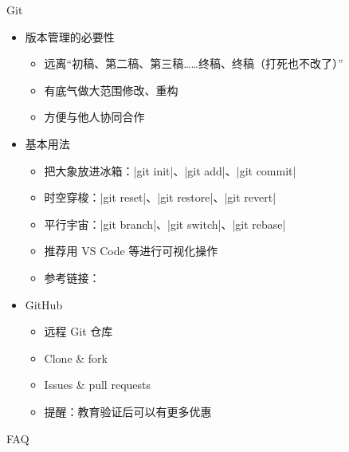 \begin{frame}{Git}
\begin{itemize}
  \item<+-> 版本管理的必要性
    \begin{itemize}
      \item 远离``初稿、第二稿、第三稿……终稿、终稿（打死也不改了）''
      \item 有底气做大范围修改、重构
      \item 方便与他人协同合作
    \end{itemize}

  \item<+-> 基本用法
    \begin{itemize}
      \item 把大象放进冰箱：|git init|、|git add|、|git commit|
      \item 时空穿梭：|git reset|、|git restore|、|git revert|
      \item 平行宇宙：|git branch|、|git switch|、|git rebase|
      \item 推荐用 VS Code 等进行可视化操作
      \item 参考链接：
    \end{itemize}

  \item<+-> GitHub 
    \begin{itemize}
      \item 远程 Git 仓库
      \item Clone \& fork
      \item Issues \& pull requests
      \item<+-> \alert{提醒：教育验证后可以有更多优惠}
    \end{itemize}
\end{itemize}
\end{frame}

\begin{frame}[standout]
  FAQ
\end{frame}

